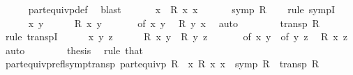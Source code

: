 \begin{isabellebody}
\ \ \ \ \isamarkupfalse%
\ part{\isacharunderscore}{\kern0pt}equivp{\isacharunderscore}{\kern0pt}def\ \isamarkupfalse%
\ blast{\isacharplus}{\kern0pt}\isanewline
\ \ \isamarkupfalse%
\ {}\ \isamarkupfalse%
\ x\ \ {\isachardoublequoteopen}R\ x\ x{\isachardoublequoteclose}\ \isacommand{{\isachardot}{\kern0pt}{\isachardot}{\kern0pt}}\isamarkupfalse%
\isanewline
\ \ \isamarkupfalse%
\ \isamarkupfalse%
\ {\isachardoublequoteopen}symp\ R{\isachardoublequoteclose}\isanewline
\ \ \isamarkupfalse%
\ {\isacharparenleft}{\kern0pt}rule\ sympI{\isacharparenright}{\kern0pt}\isanewline
\ \ \ \ \isamarkupfalse%
\ x\ y\isanewline
\ \ \ \ \isamarkupfalse%
\ {\isachardoublequoteopen}R\ x\ y{\isachardoublequoteclose}\isanewline
\ \ \ \ \isamarkupfalse%
\ {}\ {\isacharbrackleft}{\kern0pt}of\ x\ y{\isacharbrackright}{\kern0pt}\ \isamarkupfalse%
\ {\isachardoublequoteopen}R\ y\ x{\isachardoublequoteclose}\ \isamarkupfalse%
\ auto\isanewline
\ \ \isamarkupfalse%
\isanewline
\ \ \isamarkupfalse%
\ \isamarkupfalse%
\ {\isachardoublequoteopen}transp\ R{\isachardoublequoteclose}\isanewline
\ \ \isamarkupfalse%
\ {\isacharparenleft}{\kern0pt}rule\ transpI{\isacharparenright}{\kern0pt}\isanewline
\ \ \ \ \isamarkupfalse%
\ x\ y\ z\isanewline
\ \ \ \ \isamarkupfalse%
\ {\isachardoublequoteopen}R\ x\ y{\isachardoublequoteclose}\ \ {\isachardoublequoteopen}R\ y\ z{\isachardoublequoteclose}\isanewline
\ \ \ \ \isamarkupfalse%
\ {}\ {\isacharbrackleft}{\kern0pt}of\ x\ y{\isacharbrackright}{\kern0pt}\ {}\ {\isacharbrackleft}{\kern0pt}of\ y\ z{\isacharbrackright}{\kern0pt}\ \isamarkupfalse%
\ {\isachardoublequoteopen}R\ x\ z{\isachardoublequoteclose}\ \isamarkupfalse%
\ auto\isanewline
\ \ \isamarkupfalse%
\isanewline
\ \ \isamarkupfalse%
\ \isamarkupfalse%
\ thesis\ \isamarkupfalse%
\ {\isacharparenleft}{\kern0pt}rule\ that{\isacharparenright}{\kern0pt}\isanewline
{}\isamarkupfalse%
%
\endisatagproof
{\isafoldproof}%
%
\isadelimproof
\isanewline
%
\endisadelimproof
\isanewline
{}\isamarkupfalse%
\ part{\isacharunderscore}{\kern0pt}equivp{\isacharunderscore}{\kern0pt}refl{\isacharunderscore}{\kern0pt}symp{\isacharunderscore}{\kern0pt}transp{\isacharcolon}{\kern0pt}\ {\isachardoublequoteopen}part{\isacharunderscore}{\kern0pt}equivp\ R\ {\isasymlongleftrightarrow}\ {\isacharparenleft}{\kern0pt}{\isasymexists}x{\isachardot}{\kern0pt}\ R\ x\ x{\isacharparenright}{\kern0pt}\ {\isasymand}\ symp\ R\ {\isasymand}\ transp\ R{\isachardoublequoteclose}\isanewline

\end{isabellebody}
